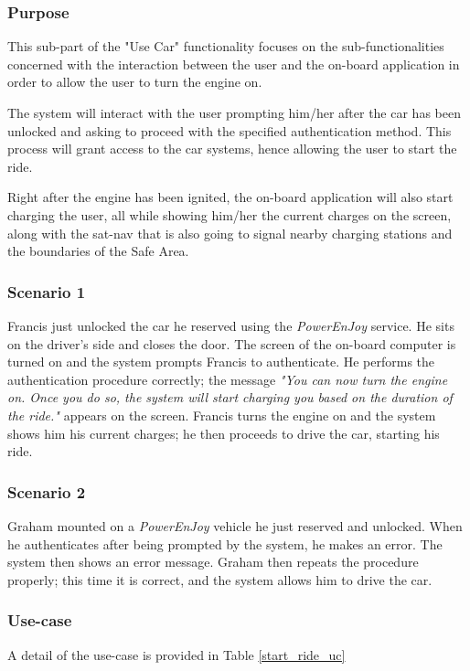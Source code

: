 \subsubsection{Purpose}
This sub-part of the "Use Car" functionality focuses on the sub-functionalities concerned with the interaction between the user and the on-board application in order to allow the user to turn the engine on.

The system will interact with the user prompting him/her after the car has been unlocked and asking to proceed with the specified authentication method. This process will grant access to the car systems, hence allowing the user to start the ride.

Right after the engine has been ignited, the on-board application will also start charging the user, all while showing him/her the current charges on the screen, along with the sat-nav that is also going to signal nearby charging stations and the boundaries of the Safe Area.

\subsubsection{Scenario 1}
Francis just unlocked the car he reserved using the \emph{PowerEnJoy} service. He sits on the driver's side and closes the door. The screen of the on-board computer is turned on and the system prompts Francis to authenticate. He performs the authentication procedure correctly; the message \emph{"You can now turn the engine on. Once you do so, the system will start charging you based on the duration of the ride."} appears on the screen. Francis turns the engine on and the system shows him his current charges; he then proceeds to drive the car, starting his ride.

\subsubsection{Scenario 2}
Graham mounted on a \emph{PowerEnJoy} vehicle he just reserved and unlocked. When he authenticates after being prompted by the system, he makes an error. The system then shows an error message. Graham then repeats the procedure properly; this time it is correct, and the system allows him to drive the car.

\subsubsection{Use-case}
A detail of the use-case is provided in Table \ref{start_ride_uc}


